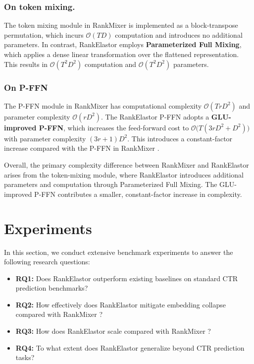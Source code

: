 \documentclass[sigconf,screen]{acmart}
\newcommand{\unimixer}{RankElastor }
\newcommand{\rankmixer}{RankMixer }
\begin{document}
\subsubsection*{\bf On token mixing.} The token mixing module in \rankmixer is implemented as a block-transpose permutation, which incurs $\mathcal{O}(TD)$ computation and introduces no additional parameters. 
In contrast, \unimixer employs \textbf{Parameterized Full Mixing}, which applies a dense linear transformation over the flattened representation. 
This results in $\mathcal{O}(T^2D^2)$ computation and $\mathcal{O}(T^2D^2)$ parameters.

\subsubsection*{\bf On P-FFN} The P-FFN module in \rankmixer has computational complexity $\mathcal{O}(TrD^2)$ and parameter complexity $\mathcal{O}(rD^2)$. 
The \unimixer P-FFN adopts a \textbf{GLU-improved P-FFN}, which increases the feed-forward cost to $\mathcal{O}\big(T(3rD^2 + D^2)\big)$ with parameter complexity $(3r+1)D^2$. 
This introduces a constant-factor increase compared with the P-FFN in \rankmixer.

Overall, the primary complexity difference between \rankmixer and \unimixer arises from the token-mixing module, where \unimixer introduces additional parameters and computation through Parameterized Full Mixing. 
The GLU-improved P-FFN contributes a smaller, constant-factor increase in complexity.





\section{Experiments}
\label{sec:exps}

In this section, we conduct extensive benchmark experiments to answer the following research questions:
\begin{itemize}[leftmargin=15pt,parsep=2pt,itemsep=2pt,topsep=2pt]
    \item {\bf RQ1:} Does \unimixer outperform existing baselines on standard CTR prediction benchmarks?
    \item {\bf RQ2:} How effectively does \unimixer mitigate embedding collapse compared with \rankmixer?
    \item {\bf RQ3:} How does \unimixer scale compared with \rankmixer?
    \item {\bf RQ4:} To what extent does \unimixer generalize beyond CTR prediction tasks?
\end{itemize}
\end{document}
